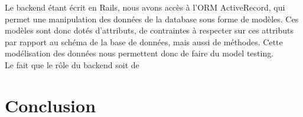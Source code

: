 \documentclass{eplmastersthesis}
\begin{document}
      Le backend étant écrit en Rails, nous avons accès à l'ORM ActiveRecord, qui
      permet une manipulation des données de la database sous forme de modèles.
      Ces modèles sont donc dotés d'attributs, de contraintes à respecter sur
      ces attributs par rapport au schéma de la base de données, mais aussi de
      méthodes. Cette modélisation des données nous permettent donc de faire
      du model testing.\\

      Le fait que le rôle du backend soit de 






  \chapter{Conclusion}

  \nocite{*}
  
  




  \backcoverpage
\end{document}
